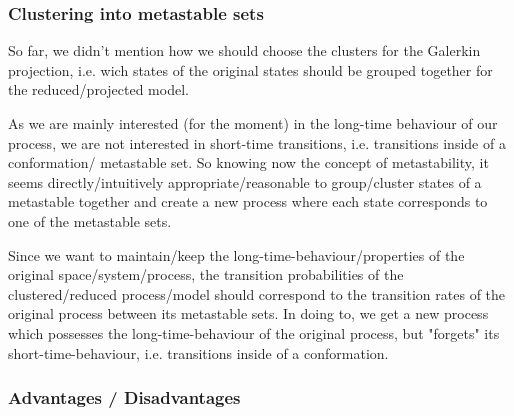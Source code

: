 \subsubsection*{Clustering into metastable sets}

So far, we didn't mention how we should choose the clusters for the Galerkin projection, i.e. wich states of the original states should be grouped together for the reduced/projected model. 

As we are mainly interested (for the moment) in the long-time behaviour of our process, we are not interested in short-time transitions, i.e. transitions inside of a conformation/ metastable set. So knowing now the concept of metastability, it seems directly/intuitively appropriate/reasonable to group/cluster states of a metastable together and create a new process where each state corresponds to one of the metastable sets.

Since we want to maintain/keep the long-time-behaviour/properties of the original space/system/process, the transition probabilities of the clustered/reduced process/model should correspond to the transition rates of the original process between its metastable sets.
In doing to, we get a new process which possesses the long-time-behaviour of the original process, but "forgets" its short-time-behaviour, i.e. transitions inside of a conformation.






\subsubsection*{Advantages / Disadvantages}

